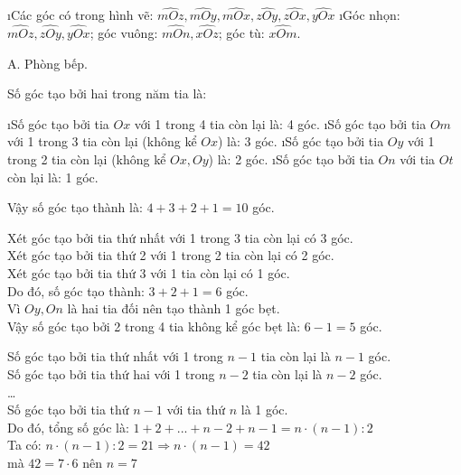 \begin{Answer}{10}
		\begin{enumerate}[a),leftmargin=*]
			\i Các góc có trong hình vẽ: $\widehat{mOz},\widehat{mOy},\widehat{mOx},\widehat{zOy},\widehat{zOx},\widehat{yOx}$
			\i Góc nhọn: $\widehat{mOz},\widehat{zOy},\widehat{yOx}$; góc vuông: $\widehat{mOn},\widehat{xOz}$; góc tù: $\widehat{xOm}$.
		\end{enumerate}
	
\end{Answer}
\begin{Answer}{11}
		A. Phòng bếp.
	
\end{Answer}
\begin{Answer}{12}
		Số góc tạo bởi hai trong năm tia là:
		\begin{enumerate}[--,leftmargin=*]
			\i Số góc tạo bởi tia $Ox$ với 1 trong 4 tia còn lại là: 4 góc.
			\i Số góc tạo bởi tia $Om$ với 1 trong 3 tia còn lại (không kể $Ox$) là: 3 góc.
			\i Số góc tạo bởi tia $Oy$ với 1 trong 2 tia còn lại (không kể $Ox,Oy$) là: 2 góc.
			\i Số góc tạo bởi tia $On$ với tia $Ot$ còn lại là: 1 góc.
		\end{enumerate}
		Vậy số góc tạo thành là: $4+3+2+1=10$ góc.
	
\end{Answer}
\begin{Answer}{13}
		Xét góc tạo bởi tia thứ nhất với 1 trong 3 tia còn lại có 3 góc.\\
		Xét góc tạo bởi tia thứ 2 với 1 trong 2 tia còn lại có 2 góc.\\
		Xét góc tạo bởi tia thứ 3 với 1 tia còn lại có 1 góc.\\
		Do đó, số góc tạo thành: $3+2+1=6$ góc.\\
		Vì $Oy,On$ là hai tia đối nên tạo thành 1 góc bẹt.\\
		Vậy số góc tạo bởi 2 trong 4 tia không kể góc bẹt là: $6-1=5$ góc.
	
\end{Answer}
\begin{Answer}{14}
		Số góc tạo bởi tia thứ nhất với 1 trong $n-1$ tia còn lại là $n-1$ góc.\\
		Số góc tạo bởi tia thứ hai với 1 trong $n-2$ tia còn lại là $n-2$ góc.\\
		\ldots \\
		Số góc tạo bởi tia thứ $n-1$ với tia thứ $n$ là 1 góc.\\
		Do đó, tổng số góc là: $1+2+...+n-2+n-1=n\cdot\left( n-1 \right):2$\\
		Ta có: $n\cdot\left( n-1 \right):2=21\Rightarrow n\cdot\left( n-1 \right)=42$\\
		mà $42=7\cdot6$ nên $n=7$
	
\end{Answer}
